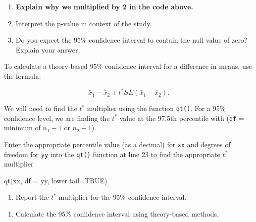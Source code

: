 \documentclass[
]{report}
\newenvironment{Shaded}{\begin{snugshade}}{\end{snugshade}}
\newcommand{\AttributeTok}[1]{\textcolor[rgb]{0.77,0.63,0.00}{#1}}
\newcommand{\ConstantTok}[1]{\textcolor[rgb]{0.00,0.00,0.00}{#1}}
\newcommand{\FunctionTok}[1]{\textcolor[rgb]{0.00,0.00,0.00}{#1}}
\newcommand{\NormalTok}[1]{#1}
\providecommand{\tightlist}{%
  \setlength{\itemsep}{0pt}\setlength{\parskip}{0pt}}
\begin{document}
\vspace{0.2in}

\begin{enumerate}
\def\labelenumi{\arabic{enumi}.}
\setcounter{enumi}{10}
\item
  \textbf{Explain why we multiplied by 2 in the code above.}
  \vspace{0.3in}
\item
  Interpret the p-value in context of the study.
  \vspace{0.8in}
\item
  Do you expect the 95\% confidence interval to contain the null value of zero? Explain your answer.
  \vspace{0.8in}
\end{enumerate}

To calculate a theory-based 95\% confidence interval for a difference in means, use the formula:

\[\bar{x}_1- \bar{x}_2\pm t^* SE(\bar{x}_1- \bar{x}_2).\]

We will need to find the \(t^*\) multiplier using the function \texttt{qt()}. For a 95\% confidence level, we are finding the \(t^*\) value at the 97.5th percentile with (\texttt{df} = minimum of \(n_1 - 1\) or \(n_2 - 1\)).

Enter the appropriate percentile value (as a decimal) for \texttt{xx} and degrees of freedom for \texttt{yy} into the \texttt{qt()} function at line 23 to find the appropriate \(t^*\) multiplier

\begin{Shaded}
\begin{Highlighting}[]
\FunctionTok{qt}\NormalTok{(xx, }\AttributeTok{df =}\NormalTok{ yy, }\AttributeTok{lower.tail=}\ConstantTok{TRUE}\NormalTok{)}
\end{Highlighting}
\end{Shaded}

\begin{enumerate}
\def\labelenumi{\arabic{enumi}.}
\setcounter{enumi}{13}
\tightlist
\item
  Report the \(t^*\) multiplier for the 95\% confidence interval.
\end{enumerate}

\vspace{0.3in}

\begin{enumerate}
\def\labelenumi{\arabic{enumi}.}
\setcounter{enumi}{14}
\tightlist
\item
  Calculate the 95\% confidence interval using theory-based methods.
\end{enumerate}
\end{document}
